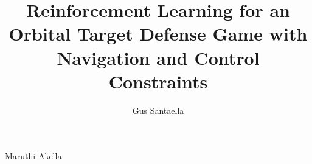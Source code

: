 \author{Gus Santaella}  	%

\address{gussantaella@utexas.edu}  %

\title{Reinforcement Learning for an Orbital Target Defense Game with Navigation and Control Constraints} %


%
%
%
%
%
%
\supervisor
	{Maruthi Akella}

%
%
%
%
%
%

